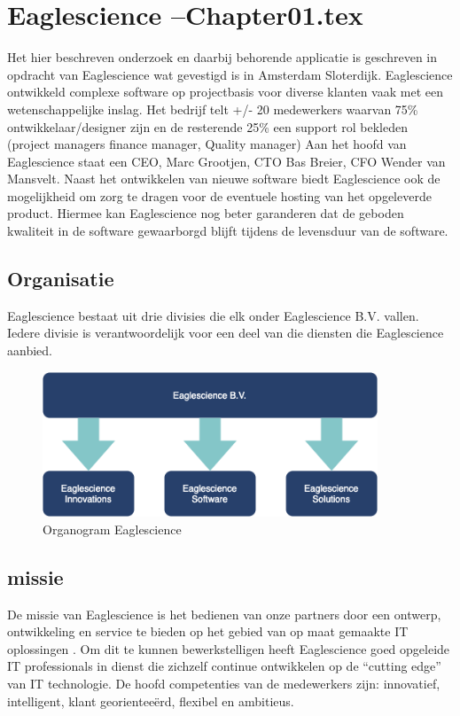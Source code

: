 \chapter{Eaglescience --Chapter01.tex} %

\label{ch:Eaglescience} %


Het hier beschreven onderzoek en daarbij behorende applicatie is geschreven in opdracht van Eaglescience wat gevestigd is in Amsterdam Sloterdijk. Eaglescience ontwikkeld complexe software op projectbasis voor diverse klanten vaak met een wetenschappelijke inslag. Het bedrijf telt +/- 20 medewerkers waarvan 75\% ontwikkelaar/designer zijn en de resterende 25\% een support rol bekleden (project managers finance manager, Quality manager)  Aan het hoofd van Eaglescience staat een CEO, Marc Grootjen, CTO Bas Breier, CFO Wender van Mansvelt. Naast het ontwikkelen van nieuwe software biedt Eaglescience ook de mogelijkheid om zorg te dragen voor de eventuele hosting van het opgeleverde product. Hiermee kan Eaglescience nog beter garanderen dat de geboden kwaliteit in de software gewaarborgd blijft tijdens de levensduur van de software.

\section{Organisatie}
Eaglescience bestaat uit drie divisies die elk onder Eaglescience B.V. vallen. Iedere divisie is verantwoordelijk voor een deel van die diensten die Eaglescience aanbied.
\begin{figure}[bth]
\myfloatalign
\includegraphics[width=10cm]{gfx/organogram}
\caption{Organogram Eaglescience}
\label{fig:Eaglescience organogram}
\end{figure}
\section{missie}
De missie van Eaglescience is het bedienen van onze partners door een ontwerp, ontwikkeling en service te bieden op het gebied van op maat gemaakte IT oplossingen . Om dit te kunnen bewerkstelligen heeft Eaglescience goed opgeleide IT professionals in dienst die zichzelf continue ontwikkelen op de “cutting edge” van IT technologie. De hoofd competenties van de medewerkers zijn: innovatief, intelligent, klant georientee\"erd, flexibel en ambitieus.
